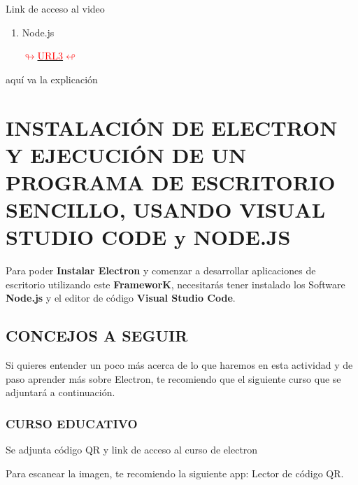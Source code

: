 Link de acceso al video

\begin{enumerate}
\renewcommand{\theenumi}{\Alph{enumi}} %
    \item Node.js\begin{minipage}[c]{0,17 \textwidth}\href{https://youtu.be/wd8zf3D0jic}{
 \def\svgwidth{0.9\textwidth}
 } 
 \end{minipage}\hyperlink{NODE2}{\textcolor{red}{$\looparrowright$URL3$\looparrowleft$}}
\end{enumerate}
\newpage
aquí va la explicación

\newpage
\section{INSTALACIÓN DE ELECTRON Y EJECUCIÓN DE
UN PROGRAMA DE ESCRITORIO SENCILLO, USANDO VISUAL STUDIO CODE y NODE.JS}

Para poder \textbf{Instalar Electron} y comenzar a desarrollar  aplicaciones de escritorio utilizando este \textbf{FrameworK}, necesitarás tener instalado los Software\textbf{ Node.js} y el  editor de código \textbf{Visual Studio Code}.
\subsection{CONCEJOS A SEGUIR}
Si quieres entender un poco más acerca de lo que haremos en esta actividad y de paso aprender más sobre Electron, te recomiendo que el siguiente curso que se adjuntará a continuación.
\subsubsection{CURSO EDUCATIVO}
 Se adjunta código QR y link de acceso al curso de electron

Para escanear la imagen, te recomiendo la siguiente app: Lector de código QR.

